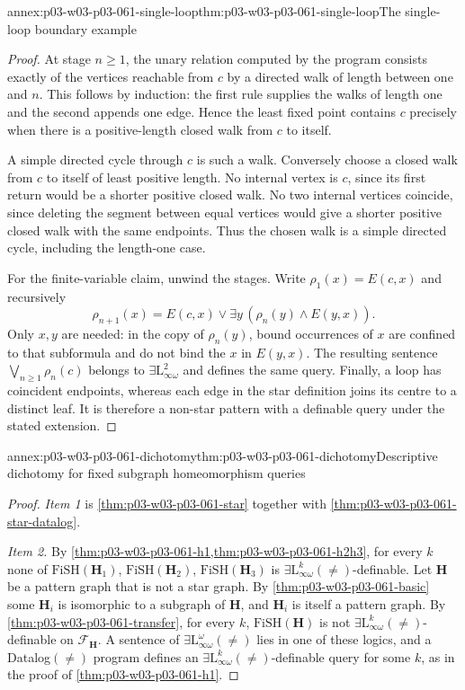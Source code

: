 \begin{annexitem}{annex:p03-w03-p03-061-single-loop}{thm:p03-w03-p03-061-single-loop}{The single-loop boundary example}
\begin{proof}
At stage \(n\ge1\), the unary relation computed by the program consists
exactly of the vertices reachable from \(c\) by a directed walk of length
between one and \(n\). This follows by induction: the first rule supplies
the walks of length one and the second appends one edge. Hence the least
fixed point contains \(c\) precisely when there is a positive-length
closed walk from \(c\) to itself.

A simple directed cycle through \(c\) is such a walk. Conversely choose
a closed walk from \(c\) to itself of least positive length. No internal
vertex is \(c\), since its first return would be a shorter positive closed
walk. No two internal vertices coincide, since deleting the segment
between equal vertices would give a shorter positive closed walk with the
same endpoints. Thus the chosen walk is a simple directed cycle, including
the length-one case.

For the finite-variable claim, unwind the stages. Write \(\rho_1(x)=E(c,x)\)
and recursively
\[
 \rho_{n+1}(x)=E(c,x)\vee\exists y\,(\rho_n(y)\wedge E(y,x)).
\]
Only \(x,y\) are needed: in the copy of \(\rho_n(y)\), bound occurrences
of \(x\) are confined to that subformula and do not bind the \(x\) in
\(E(y,x)\). The resulting sentence
\(\bigvee_{n\ge1}\rho_n(c)\) belongs to
\(\exists\mathrm L^2_{\infty\omega}\) and defines the same query.
Finally, a loop has coincident endpoints, whereas each edge in the star
definition joins its centre to a distinct leaf. It is therefore a
non-star pattern with a definable query under the stated extension.
\end{proof}
\end{annexitem}

\begin{annexitem}{annex:p03-w03-p03-061-dichotomy}{thm:p03-w03-p03-061-dichotomy}{Descriptive dichotomy for fixed subgraph homeomorphism queries}
\begin{proof}
\emph{Item 1} is \cref{thm:p03-w03-p03-061-star} together with
\cref{thm:p03-w03-p03-061-star-datalog}.

\emph{Item 2.} By \cref{thm:p03-w03-p03-061-h1,thm:p03-w03-p03-061-h2h3},
for every \(k\) none of \(\mathrm{FiSH}(\mathbf H_1)\),
\(\mathrm{FiSH}(\mathbf H_2)\), \(\mathrm{FiSH}(\mathbf H_3)\) is
\(\exists\mathrm L^k_{\infty\omega}(\neq)\)-definable. Let \(\mathbf H\) be
a pattern graph that is not a star graph. By
\cref{thm:p03-w03-p03-061-basic} some \(\mathbf H_i\) is isomorphic to a
subgraph of \(\mathbf H\), and \(\mathbf H_i\) is itself a pattern graph. By
\cref{thm:p03-w03-p03-061-transfer}, for every \(k\),
\(\mathrm{FiSH}(\mathbf H)\) is not
\(\exists\mathrm L^k_{\infty\omega}(\neq)\)-definable on
\(\mathcal F_{\mathbf H}\). A sentence of
\(\exists\mathrm L^\omega_{\infty\omega}(\neq)\) lies in one of these logics,
and a Datalog\((\neq)\) program defines an
\(\exists\mathrm L^k_{\infty\omega}(\neq)\)-definable query for some \(k\),
as in the proof of \cref{thm:p03-w03-p03-061-h1}.
\end{proof}
\end{annexitem}
